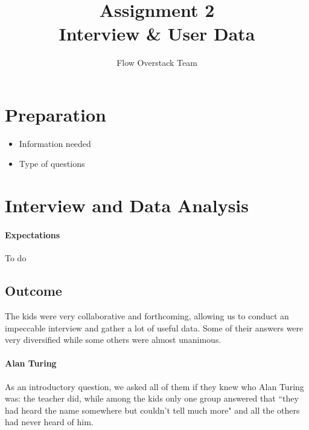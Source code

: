 \documentclass[12pt]{scrartcl}
\title{Assignment 2\\ Interview \& User Data}
\author{Flow Overstack Team}
\date{}
\begin{document}
\maketitle


\section*{Preparation}
	\begin{itemize}
		\item Information needed
		\item Type of questions
\end{itemize}


\section*{Interview and Data Analysis}
	\paragraph{Expectations}
		To do
		
	\subsection*{Outcome}
		The kids were very collaborative and forthcoming, allowing us to conduct an impeccable interview and gather a lot of useful data. Some of their answers were very diversified while some others were almost unanimous.
		
		\paragraph{Alan Turing} As an introductory question, we asked all of them if they knew who Alan Turing was: the teacher did, while among the kids only one group answered that ``they had heard the name somewhere but couldn't tell much more" and all the others had never heard of him. 
		
\end{document}
